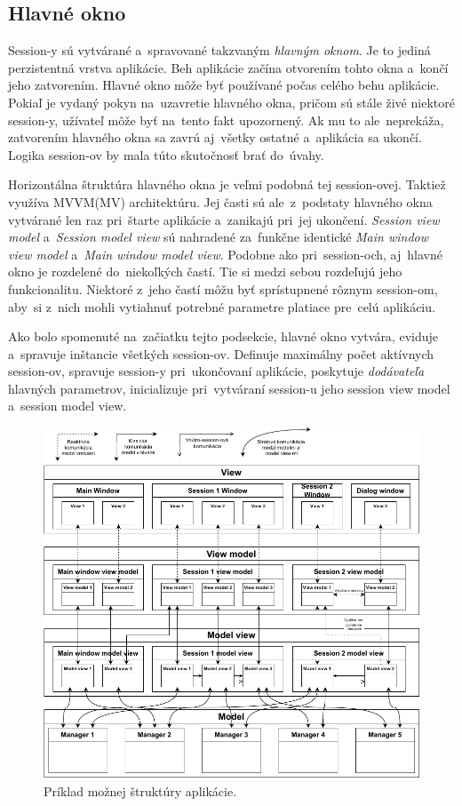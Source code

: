 \subsection{Hlavné okno}\label{Hlavne_okno_obecne}

Session-y sú vytvárané a~spravované takzvaným \textit{hlavným oknom}. Je to jediná perzistentná  vrstva aplikácie. Beh aplikácie začína otvorením tohto okna a~končí jeho zatvorením. Hlavné okno môže byť používané počas celého behu aplikácie. Pokiaľ je vydaný pokyn na~uzavretie hlavného okna, pričom sú stále živé niektoré session-y, užívateľ môže byť na~tento fakt upozornený. Ak mu to ale~neprekáža, zatvorením hlavného okna sa zavrú aj~všetky ostatné a~aplikácia sa ukončí. Logika session-ov by mala túto skutočnosť brať do~úvahy.

Horizontálna štruktúra hlavného okna je veľmi podobná tej session-ovej. Taktiež využíva MVVM(MV) architektúru. Jej časti sú ale~z~podstaty hlavného okna vytvárané len raz pri~štarte aplikácie a~zanikajú pri~jej ukončení. \textit{Session view model} a~\textit{Session model view} sú nahradené za~funkčne identické \textit{Main window view model} a~\textit{Main window model view}. Podobne ako pri~session-och, aj~hlavné okno je rozdelené do~niekoľkých častí. Tie si medzi sebou rozdeľujú jeho funkcionalitu. Niektoré z~jeho častí môžu byť sprístupnené rôznym session-om, aby~si z~nich mohli vytiahnuť potrebné parametre platiace pre~celú aplikáciu.     

Ako bolo spomenuté na~začiatku tejto podsekcie, hlavné okno vytvára, eviduje a~spravuje inštancie všetkých session-ov. Definuje maximálny počet aktívnych session-ov, spravuje session-y pri~ukončovaní aplikácie, poskytuje \textit{dodávateľa} hlavných parametrov, inicializuje pri~vytváraní session-u jeho session view model a~session model view.  

\begin{figure}[p]\centering
\includegraphics[]{img/priklad_struktury}
\caption{Príklad možnej  štruktúry aplikácie.} 
\label{obr02:priklad_struktury}
\end{figure}
